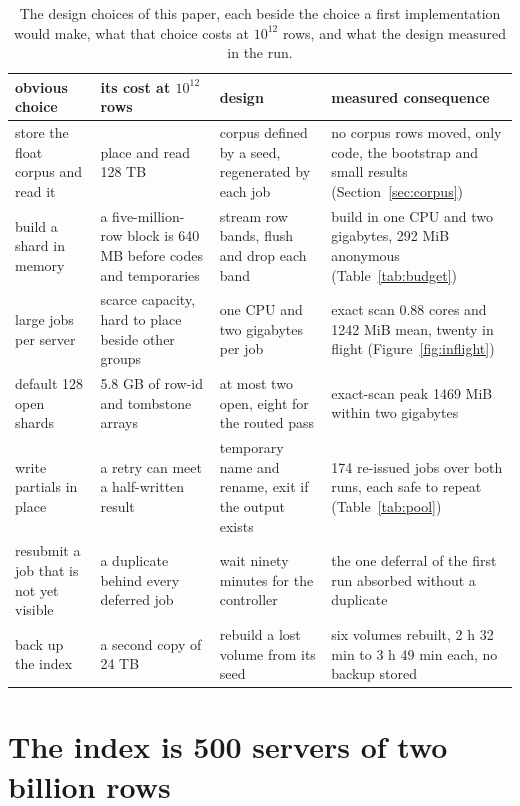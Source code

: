 \documentclass[sigconf, nonacm]{acmart}
\begin{document}
\begin{table}[t]
\caption{The design choices of this paper, each beside the choice a first implementation would
make, what that choice costs at $10^{12}$ rows, and what the design measured in the run.}
\label{tab:design}
\centering
\small
\begin{tabular}{p{}p{}p{}p{}}
\toprule
obvious choice & its cost at $10^{12}$ rows & design & measured consequence \\
\midrule
store the float corpus and read it & place and read 128 TB & corpus defined by a seed,
regenerated by each job & no corpus rows moved, only code, the bootstrap and small results
(Section~\ref{sec:corpus}) \\
build a shard in memory & a five-million-row block is 640 MB before codes and temporaries &
stream row bands, flush and drop each band & build in one CPU and two gigabytes, 292 MiB
anonymous (Table~\ref{tab:budget}) \\
large jobs per server & scarce capacity, hard to place beside other groups & one CPU and two
gigabytes per job & exact scan 0.88 cores and 1242 MiB mean, twenty in flight
(Figure~\ref{fig:inflight}) \\
default 128 open shards & 5.8 GB of row-id and tombstone arrays & at most two open, eight for
the routed pass & exact-scan peak 1469 MiB within two gigabytes \\
write partials in place & a retry can meet a half-written result & temporary name and rename,
exit if the output exists & 174 re-issued jobs over both runs, each safe to repeat
(Table~\ref{tab:pool}) \\
resubmit a job that is not yet visible & a duplicate behind every deferred job & wait ninety
minutes for the controller & the one deferral of the first run absorbed without a duplicate \\
back up the index & a second copy of 24 TB & rebuild a lost volume from its seed & six volumes
rebuilt, 2 h 32 min to 3 h 49 min each, no backup stored \\
\bottomrule
\end{tabular}
\end{table}

\section{The index is 500 servers of two billion rows}
\label{sec:system}
\end{document}
